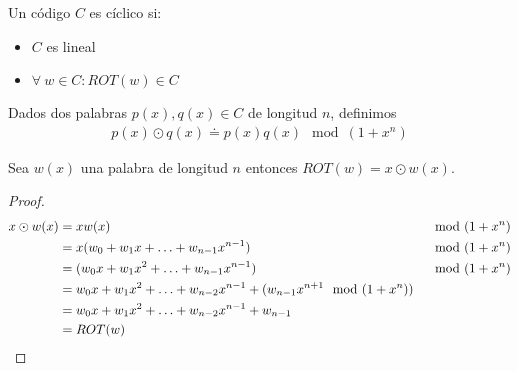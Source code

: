 \begin{definition}
Un código $C$ es cíclico si:
\begin{itemize}
    \item $C$ es lineal
    \item $\forall~ w \in C : ROT(w) \in C$
\end{itemize}
\end{definition}


\begin{definition}
Dados dos palabras $p(x), q(x) \in C$ de longitud $n$, definimos
\begin{align}
    p(x) \odot q(x) \doteq p(x) q(x) \mod{(1+x^n)}
\end{align}
\end{definition}

\begin{proposition}
Sea $w(x)$ una palabra de longitud $n$ entonces $ROT(w) = x \odot w(x)$.
\end{proposition}
\begin{proof}
\begin{align}
    x \odot w(x)
    &= xw(x) &&\mod{(1+x^n)}\\
    &= x(w_0 + w_1 x + \mathellipsis + w_{n-1} x^{n-1}) &&\mod{(1+x^n)}\\
    &= (w_0 x + w_1 x^2 + \mathellipsis + w_{n-1} x^{n-1}) &&\mod{(1+x^n)}\\
    &= w_0 x + w_1 x^2 + \mathellipsis + w_{n-2} x^{n-1} + (w_{n-1} x^{n+1} \mod{(1+x^n)})\\
    &= w_0 x + w_1 x^2 + \mathellipsis + w_{n-2} x^{n-1} + w_{n-1}\\
    &= ROT(w)
\end{align}
\end{proof}


